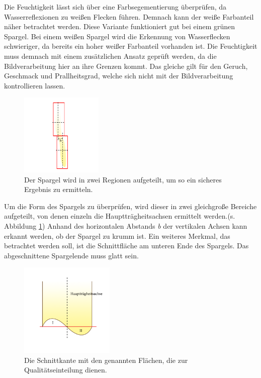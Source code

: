 \documentclass{ezb}
\begin{document}
\linebreak
Die Feuchtigkeit lässt sich über eine Farbsegementierung überprüfen, da Wasserreflexionen zu weißen Flecken führen. Demnach kann der weiße Farbanteil näher betrachtet werden. Diese Variante funktioniert gut bei einem grünen Spargel. Bei einem weißen Spargel wird die Erkennung von Wasserflecken schwieriger, da bereits ein hoher weißer Farbanteil vorhanden ist. Die Feuchtigkeit muss demnach mit einem zusätzlichen Ansatz geprüft werden, da die Bildverarbeitung hier an ihre Grenzen kommt. Das gleiche gilt für den Geruch, Geschmack und Prallheitsgrad, welche sich nicht mit der Bildverarbeitung kontrollieren lassen. \linebreak
\begin{figure}
\includegraphics[width=0.35\textwidth]{schief.png}
\caption{\label{fig:schief}Der Spargel wird in zwei Regionen aufgeteilt, um so ein sicheres Ergebnis zu ermitteln.}
\end{figure}
Um die Form des Spargels zu überprüfen, wird dieser in zwei gleichgroße Bereiche aufgeteilt, von denen einzeln die Hauptträgheitsachsen ermittelt werden.(s. Abbildung \ref{fig:schief})
Anhand des horizontalen Abstands \textit{b} der vertikalen Achsen kann erkannt werden, ob der Spargel zu krumm ist.
\clearpage
Ein weiteres Merkmal, das betrachtet werden soll, ist die Schnittfläche am unteren Ende des Spargels. Das abgeschnittene Spargelende muss glatt sein.\\
\begin{figure}
\includegraphics[width=0.4\textwidth]{schnitt.png}
\caption{\label{fig:schnitt}Die Schnittkante mit den genannten Flächen, die zur Qualitätseinteilung dienen.}
\end{figure}
\end{document}

